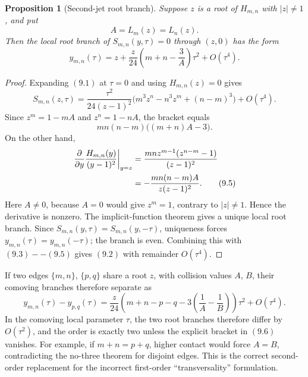 \documentclass[11pt]{article}
\newtheorem{proposition}[theorem]{Proposition}
\theoremstyle{definition}
\begin{document}
\begin{proposition}[Second-jet root branch]\label{prop:secondjet}
Suppose $z$ is a root of $H_{m,n}$ with $|z|\neq1$, and put
\[
 A=L_m(z)=L_n(z).
\]
Then the local root branch of \(S_{m,n}(y,\tau)=0\) through \((z,0)\) has the
form
\begin{equation}
 y_{m,n}(\tau)=z+
 \frac z{24}\left(m+n-\frac3A\right)\tau^2+O(\tau^4).
 \tag{9.2}
\end{equation}
\end{proposition}

\begin{proof}
Expanding \((9.1)\) at \(\tau=0\) and using \(H_{m,n}(z)=0\) gives
\begin{equation}
 S_{m,n}(z,\tau)
 =\frac{\tau^2}{24(z-1)^2}
 \bigl(m^3z^n-n^3z^m+(n-m)^3\bigr)
 +O(\tau^4).
 \tag{9.3}
\end{equation}
Since \(z^m=1-mA\) and \(z^n=1-nA\), the bracket equals
\begin{equation}
 mn(n-m)\bigl((m+n)A-3\bigr).
 \tag{9.4}
\end{equation}
On the other hand,
\begin{align}
 \left.\frac{\partial}{\partial y}
 \frac{H_{m,n}(y)}{(y-1)^2}\right|_{y=z}
 &=\frac{mnz^{m-1}(z^{n-m}-1)}{(z-1)^2} \notag\\
 &=-\frac{mn(n-m)A}{z(z-1)^2}.
 \tag{9.5}
\end{align}
Here \(A\neq0\), because \(A=0\) would give \(z^m=1\), contrary to
\(|z|\neq1\).  Hence the derivative is nonzero.  The implicit-function
theorem gives a unique local root branch.  Since
\(S_{m,n}(y,\tau)=S_{m,n}(y,-\tau)\), uniqueness forces
\(y_{m,n}(\tau)=y_{m,n}(-\tau)\); the branch is even.  Combining this with
\((9.3)--(9.5)\) gives \((9.2)\) with remainder \(O(\tau^4)\).
\end{proof}

If two edges \(\{m,n\}\), \(\{p,q\}\) share a root \(z\), with collision
values \(A\), \(B\), their comoving branches therefore separate as
\begin{equation}
 y_{m,n}(\tau)-y_{p,q}(\tau)
 =\frac z{24}
 \left(m+n-p-q-3\left(\frac1A-\frac1B\right)\right)\tau^2
 +O(\tau^4).
 \tag{9.6}
\end{equation}
In the comoving local parameter \(\tau\), the two root branches therefore
differ by \(O(\tau^2)\), and the order is exactly two unless the explicit
bracket in \((9.6)\) vanishes.
For example, if \(m+n=p+q\), higher contact would force \(A=B\), contradicting
the no-three theorem for disjoint edges.  This is the correct second-order
replacement for the incorrect first-order ``transversality'' formulation.
\end{document}
